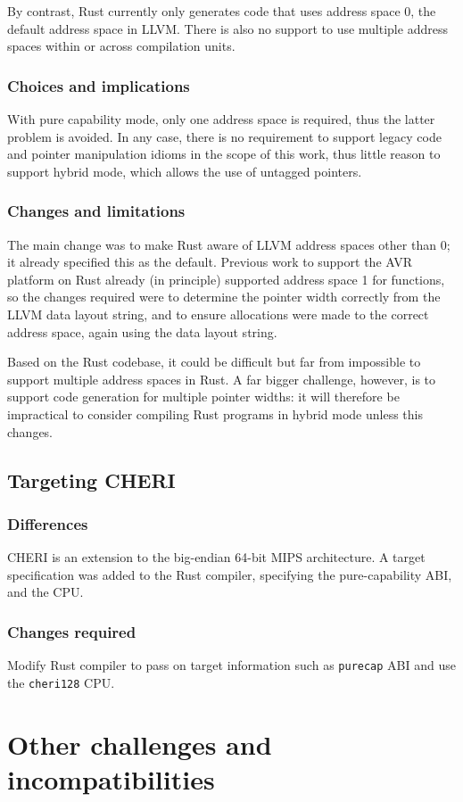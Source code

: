 \documentclass[dissertation.tex]{subfiles}
\begin{document}
By contrast, Rust currently only generates code that uses address space
0, the default address space in LLVM.
There is also no support to use multiple address spaces within or across
compilation units.

\subsubsection{Choices and implications}
With pure capability mode, only one address space is required, thus the
latter problem is avoided.
In any case, there is no requirement to support legacy code and pointer
manipulation idioms in the scope of this work, thus little reason to
support hybrid mode, which allows the use of untagged pointers.

\subsubsection{Changes and limitations}
The main change was to make Rust aware of LLVM address spaces other than
0; it already specified this as the default.
Previous work to support the AVR platform on Rust already (in principle)
supported address space 1 for functions, so the changes required were to
determine the pointer width correctly from the LLVM data layout string,
and to ensure allocations were made to the correct address space, again
using the data layout string.

Based on the Rust codebase, it could be difficult but far from
impossible to support multiple address spaces in Rust.
A far bigger challenge, however, is to support code generation for
multiple pointer widths: it will therefore be impractical to consider
compiling Rust programs in hybrid mode unless this changes.


\subsection{Targeting CHERI}
\label{sec:impl-cheritarget}

\subsubsection{Differences}
CHERI is an extension to the big-endian 64-bit MIPS architecture.
A target specification was added to the Rust compiler, specifying the
pure-capability ABI, and the CPU.

\subsubsection{Changes required}
Modify Rust compiler to pass on target information such as
\texttt{purecap} ABI and use the \texttt{cheri128} CPU.


\section{Other challenges and incompatibilities}
\end{document}

